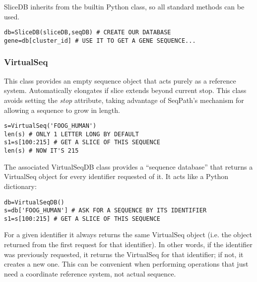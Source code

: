 \documentclass{howto}
\begin{document}
SliceDB inherits from the builtin Python  class,
so all standard methods can be used.

\begin{verbatim}
db=SliceDB(sliceDB,seqDB) # CREATE OUR DATABASE
gene=db[cluster_id] # USE IT TO GET A GENE SEQUENCE...
\end{verbatim}


\subsubsection{VirtualSeq}
This class provides an empty sequence object that
acts purely as a reference system.
Automatically elongates if slice extends beyond current stop.
This class avoids setting the {\em stop} attribute, taking advantage
of SeqPath's mechanism for allowing a sequence to grow in length.
\begin{verbatim}
s=VirtualSeq('FOOG_HUMAN')
len(s) # ONLY 1 LETTER LONG BY DEFAULT
s1=s[100:215] # GET A SLICE OF THIS SEQUENCE
len(s) # NOW IT'S 215
\end{verbatim}

The associated VirtualSeqDB class provides a ``sequence database''
that returns a VirtualSeq object for every identifier requested of
it.  It acts like a Python dictionary:
\begin{verbatim}
db=VirtualSeqDB()
s=db['FOOG_HUMAN'] # ASK FOR A SEQUENCE BY ITS IDENTIFIER
s1=s[100:215] # GET A SLICE OF THIS SEQUENCE
\end{verbatim}
For a given identifier it always returns the same VirtualSeq
object (i.e. the object returned from the first request for that identifier).
In other words, if the identifier was previously requested,
it returns the VirtualSeq for that identifier; if not, it 
creates a new one.
This can be convenient when performing operations that just
need a coordinate reference system, not actual sequence.
\end{document}
